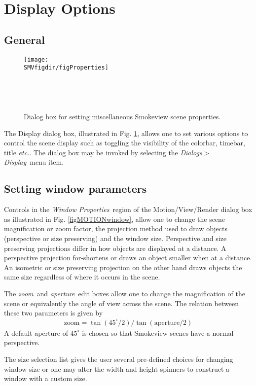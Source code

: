\documentclass[11pt,twoside]{book}
\begin{document}
\section{Display Options}
\subsection{General}
\begin{figure}[bph]
\centerline{\texttt{[image: \\SMVfigdir/figProperties]}
}\ \caption [Dialog box for setting miscellaneous Smokeview scene
properties.] {Dialog box for setting miscellaneous Smokeview scene
properties.}\ \label{figProperties}
\end{figure}
The Display dialog box, illustrated in Fig.
\ref{figProperties}, allows one to set various options to control
the scene display such as toggling the visibility of the colorbar, timebar, title {\em etc.}.  The  dialog box may be
invoked by selecting the {\em Dialogs$>$Display}\ menu item.

\subsection{Setting window parameters}
Controls in the {\em Window Properties}\ region of the Motion/View/Render dialog box as illustrated in Fig. \ref{figMOTIONwindow},
allow one to change the scene magnification or zoom factor, the
projection method used to draw objects (perspective or size preserving) and the window size.
Perspective and size preserving projections differ in how objects are displayed
at a distance.  A perspective projection for-shortens or draws an
object smaller when at a distance. An isometric or size preserving projection
on the other hand draws objects the same size regardless of
where it occurs in the scene.

The {\em zoom}\ and {\em aperture}\ edit boxes allow one to change
the magnification of the scene or equivalently the angle of view
across the scene.  The relation between these two parameters is
given by
\begin{eqnarray}
\mbox{zoom}=\tan(45^\circ/2)/\tan(\mbox{aperture}/2)
\end{eqnarray}
A default aperture of $45^\circ$ is chosen so that Smokeview
scenes have a normal perspective.

The size selection list gives the user several pre-defined choices for changing window size or one may alter
the width and height spinners to construct a window with a custom size.
\end{document}
